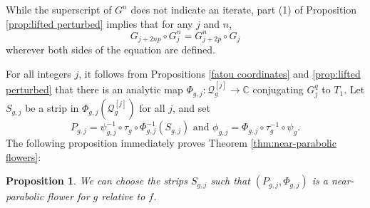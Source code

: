 \documentclass[12pt,letterpaper]{amsart}
\numberwithin{equation}{section}
\newtheorem{prop}[equation]{Proposition}
\theoremstyle{remark}
\theoremstyle{definition}
\newcommand{\C}{\mathbb C}
\newcommand{\QQ}{\mathcal Q}
\begin{document}
 	While the superscript of $G^n$ does not indicate an iterate, part (1) of Proposition \ref{prop:lifted perturbed} implies that for any $j$ and $n$, 
 	$$G_{j+2np}\circ G_j^n = G_{j+2p}^n\circ G_j$$
 	wherever both sides of the equation are defined.
 	
 	
 	For all integers $j$,  it follows from Propositions \ref{fatou coordinates} and \ref{prop:lifted perturbed} that there is an analytic map $\Phi_{g, j}: \QQ_g^{[j]}\to \C$ conjugating ${G}_j^q$ to $T_1$.
 	Let $S_{g, j}$ be a strip in $\Phi_{g, j}(\QQ_g^{[j]})$ for all $j$, and set 
 	$$P_{g, j} = \psi_{g, j}^{-1}\circ \tau_g\circ \Phi_{g, j}^{-1}(S_{g, j})\text{ and }\phi_{g, j} = \Phi_{g, j}\circ \tau_g^{-1}\circ \psi_g.$$
 	The following proposition immediately proves Theorem \ref{thm:near-parabolic flowers}:
 	
 	
 	
 	
 	
 	\begin{prop}
 		We can choose the strips $S_{g, j}$ such that $(P_{g, j}, \Phi_{g, j})$ is a near-parabolic flower for $g$ relative to $f$.
 	\end{prop}
 	
\end{document}
